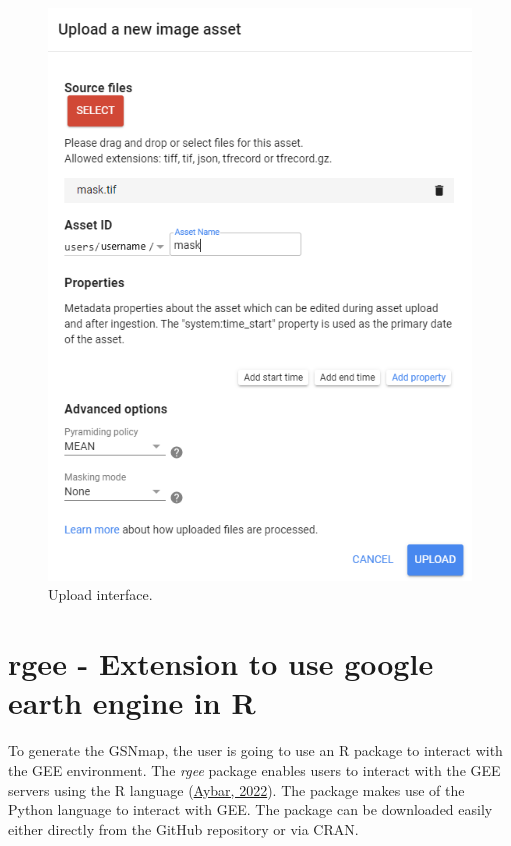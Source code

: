 \documentclass[
  10pt,
  b5paper,
  oneside]{book}
\begin{document}
\begin{figure}
\includegraphics[width=7.56in]{images/2.3_upload-assets-2} \caption{Upload interface.}\label{fig:upload}
\end{figure}

\hypertarget{rgee---extension-to-use-google-earth-engine-in-r}{%
\section{rgee - Extension to use google earth engine in R}\label{rgee---extension-to-use-google-earth-engine-in-r}}

To generate the GSNmap, the user is going to use an R package to interact with the GEE environment. The \emph{rgee} package enables users to interact with the GEE servers using the R language (\protect\hyperlink{ref-rgee}{Aybar, 2022}). The package makes use of the Python language to interact with GEE. The package can be downloaded easily either directly from the GitHub repository or via CRAN.
\end{document}
